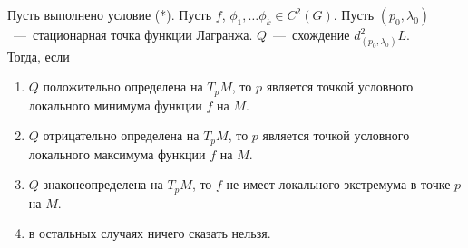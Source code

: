 \begin{theorem} Пусть выполнено условие (*). Пусть $f$, $\phi_1, \ldots \phi_k \in C^2(G)$. Пусть $(p_0, \lambda_0)$~---~стационарная точка функции Лагранжа. $Q$~---~схождение $d^2_{(p_0, \lambda_0)}L$. \\
    Тогда, если 
    \begin{enumerate}
        \item $Q$ положительно определена на $T_p M$, то $p$ является точкой условного локального минимума функции $f$ на $M$.
        \item $Q$ отрицательно определена на $T_p M$, то $p$ является точкой условного локального максимума функции $f$ на $M$.
        \item $Q$ знаконеопределена на $T_p M$, то $f$ не имеет локального экстремума в точке $p$ на $M$.
        \item в остальных случаях ничего сказать нельзя.
    \end{enumerate}
\end{theorem}
